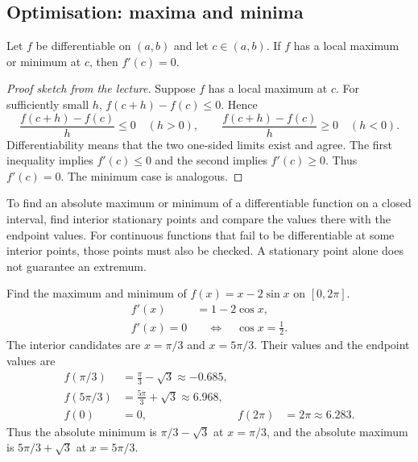 \subsection{Optimisation: maxima and minima}
\begin{theorem}
Let $f$ be differentiable on $(a,b)$ and let $c\in(a,b)$.
If $f$ has a local maximum or minimum at $c$, then $f'(c)=0$.
\end{theorem}

\begin{proof}[Proof sketch from the lecture]
Suppose $f$ has a local maximum at $c$. For sufficiently small $h$,
$f(c+h)-f(c)\le0$. Hence
\[
 \frac{f(c+h)-f(c)}{h}\le0\quad(h>0),\qquad
 \frac{f(c+h)-f(c)}{h}\ge0\quad(h<0).
\]
Differentiability means that the two one-sided limits exist and agree.
The first inequality implies $f'(c)\le0$ and the second implies
$f'(c)\ge0$. Thus $f'(c)=0$. The minimum case is analogous.
\end{proof}

To find an absolute maximum or minimum of a differentiable function on a closed
interval, find interior stationary points and compare the values there with
the endpoint values. For continuous functions that fail to be differentiable
at some interior points, those points must also be checked.
A stationary point alone does not guarantee an extremum.

\begin{example}
Find the maximum and minimum of $f(x)=x-2\sin x$ on $[0,2\pi]$.
\begin{align*}
 f'(x)&=1-2\cos x,\\
 f'(x)=0&\quad\Longleftrightarrow\quad\cos x=\frac12.
\end{align*}
The interior candidates are $x=\pi/3$ and $x=5\pi/3$.
Their values and the endpoint values are
\begin{align*}
 f(\pi/3)&=\frac\pi3-\sqrt3\approx-0.685,\\
 f(5\pi/3)&=\frac{5\pi}3+\sqrt3\approx6.968,\\
 f(0)&=0, & f(2\pi)&=2\pi\approx6.283.
\end{align*}
Thus the absolute minimum is $\pi/3-\sqrt3$ at $x=\pi/3$,
and the absolute maximum is $5\pi/3+\sqrt3$ at $x=5\pi/3$.
\end{example}

\begin{center}
\end{center}

